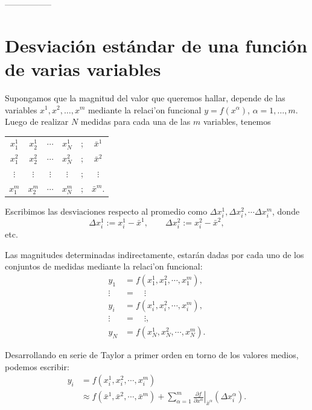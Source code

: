 \documentclass[letterpaper,11pt]{report}
\begin{document}
-----------------
\newpage

\section{Desviación estándar de una función de varias variables}\label{sec:propdesv}

Supongamos que la magnitud del valor que queremos hallar, depende de las variables $x^1, x^2, \dots, x^m$  mediante la relaci'on funcional $y=f(x^\alpha)$, $\alpha=1,\dots,m$. Luego de realizar $N$ medidas para cada una de las $m$ variables, tenemos
\begin{center}
\begin{tabular}{cccccc}
$x^1_1$ & $x^1_2$ & $\cdots$ & $x^1_N$ & ; & $\bar{x}^1$ \\ 
$x^2_1$ & $x^2_2$ & $\cdots$ & $x^2_N$ & ; & $\bar{x}^2$ \\ 
$\vdots$ & $\vdots$ & $\vdots$ & $\vdots$ & ; & $\vdots$ \\ 
$x^m_1$ & $x^m_2$ & $\cdots$ & $x^m_N$ & ; & $\bar{x}^m$.
\end{tabular} 
\end{center}
Escribimos las desviaciones respecto al promedio como $\Delta x^1_i, \Delta x^2_i, \cdots \Delta x^m_i$, donde
\begin{equation}
\Delta x^1_i:=x_i^1-\bar{x}^1, \qquad \Delta x^2_i:=x_i^2-\bar{x}^2,
\end{equation}
etc.

Las magnitudes determinadas indirectamente, estarán dadas por cada uno de los conjuntos de medidas mediante la relaci'on funcional:
\begin{align}
y_1 &= f(x^1_1,x^2_1,\cdots, x^m_1), \\
\vdots &= \quad\vdots  \\
y_i &= f(x^1_i,x^2_i,\cdots, x^m_i),\\
\vdots &= \quad \vdots,  \\
y_N &= f(x^1_N,x^2_N,\cdots, x^m_N).
\end{align}

Desarrollando en serie de Taylor a primer orden en torno de los valores medios, podemos escribir:
\begin{align}
y_i & = f(x^1_i,x^2_i,\cdots, x^m_i)\\
&\approx  f(\bar{x}^1,\bar{x}^2,\cdots, \bar{x}^m)+ \sum_{\alpha=1}^m\left.\frac{\partial f}{\partial x^\alpha}\right|_{\bar{x}^\alpha}(\Delta x^\alpha_i).
\end{align}
\end{document}
